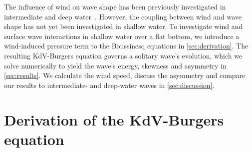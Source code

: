 \documentclass{jfm}
\begin{document}
The influence of wind on wave shape has been previously investigated in
intermediate and deep water~\citep{zdyrski2020wind}.
However, the coupling between wind and wave shape has not yet been
investigated in shallow water.
To investigate wind and surface wave interactions in shallow water over
a flat bottom, we introduce a wind-induced pressure term to the
Boussinesq equations in \cref{sec:derivation}.
The resulting KdV-Burgers equation governs a solitary wave's evolution,
which we solve numerically
to yield the wave's energy, skewness and asymmetry
in \cref{sec:results}.
We calculate the wind speed, discuss the asymmetry and
compare our results to intermediate- and deep-water waves in
\cref{sec:discussion}.

\section{\label{sec:derivation} Derivation of the KdV-Burgers equation}
\end{document}
